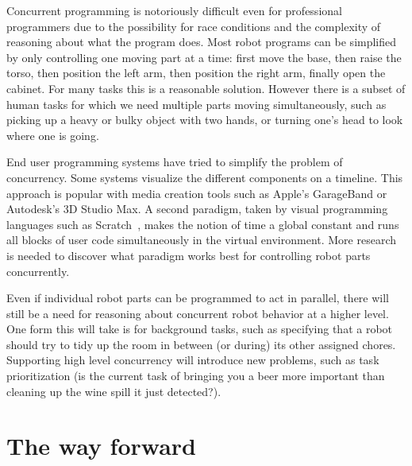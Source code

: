 \documentclass[10pt,twocolumn]{article}
\begin{document}
Concurrent programming is notoriously difficult even for professional programmers due to the possibility for race conditions and the complexity of reasoning about what the program does. Most robot programs can be simplified by only controlling one moving part at a time: first move the base, then raise the torso, then position the left arm, then position the right arm, finally open the cabinet. For many tasks this is a reasonable solution. However there is a subset of human tasks for which we need multiple parts moving simultaneously, such as picking up a heavy or bulky object with two hands, or turning one's head to look where one is going.

End user programming systems have tried to simplify the problem of concurrency. Some systems visualize the different components on a timeline. This approach is popular with media creation tools such as Apple's GarageBand or Autodesk's 3D Studio Max. A second paradigm, taken by visual programming languages such as Scratch~\cite{scratch}, makes the notion of time a global constant and runs all blocks of user code simultaneously in the virtual environment. More research is needed to discover what paradigm works best for controlling robot parts concurrently.


Even if individual robot parts can be programmed to act in parallel, there will still be a need for reasoning about concurrent robot behavior at a higher level. One form this will take is for background tasks, such as specifying that a robot should try to tidy up the room in between (or during) its other assigned chores. Supporting high level concurrency will introduce new problems, such as task prioritization (is the current task of bringing you a beer more important than cleaning up the wine spill it just detected?).

\section{The way forward}
\end{document}
